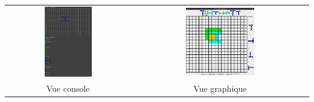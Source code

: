     \begin{table}[h]\label{img:plateau}
        \centering
        \begin{tabular}{cc}
            \includegraphics[width=0.40\textwidth, keepaspectratio]{img/vueConsole.png} & \includegraphics[width=0.40\textwidth, keepaspectratio]{img/vueGraphique.png}\\
            Vue console & Vue graphique\\
        \end{tabular}
   \end{table}
